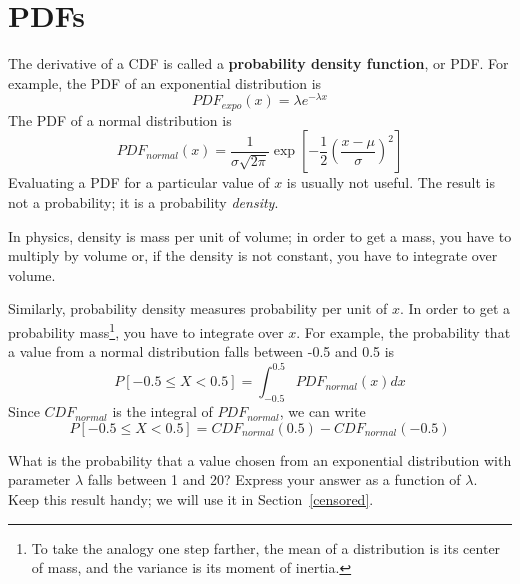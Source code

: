 \documentclass[12pt]{book}
\begin{document}
\section{PDFs}
\label{density}




The derivative of a CDF is called a {\bf probability density function},
or PDF.  For example, the PDF of an exponential distribution is
%
\[ PDF_{expo}(x) = \lambda e^{-\lambda x}   \]
%
The PDF of a normal distribution is
%
\[ PDF_{normal}(x) = \frac{1}{\sigma \sqrt{2 \pi}} 
                 \exp \left[ -\frac{1}{2} 
                 \left( \frac{x - \mu}{\sigma} \right)^2 \right]  \]
%
Evaluating a PDF for a particular value of $x$ is usually not useful.
The result is not a probability; it is a probability {\em density}.


In physics, density is mass per unit of
volume; in order to get a mass, you have to multiply by volume or,
if the density is not constant, you have to integrate over volume.


Similarly, probability density measures probability per unit of $x$.
In order to get a probability mass\footnote{To take the analogy one
step farther, the mean of a distribution is its center of mass, and
the variance is its moment of inertia.}, you have to integrate over $x$.
For example, the probability that a value from a normal distribution
falls between -0.5 and 0.5 is
%
\[ P[-0.5 \le X < 0.5] = \int_{-0.5}^{0.5} PDF_{normal}(x) dx \]
%
Since $CDF_{normal}$ is the integral of $PDF_{normal}$, we can write
%
\[ P[-0.5 \le X < 0.5] = CDF_{normal}(0.5) - CDF_{normal}(-0.5) \]


\begin{ex}
\label{expo_pdf}


What is the probability that a value chosen from an exponential
distribution with parameter $\lambda$ falls between 1 and 20?  Express
your answer as a function of $\lambda$.  Keep this result handy;
we will use it in Section~\ref{censored}.

\end{ex}
\end{document}
